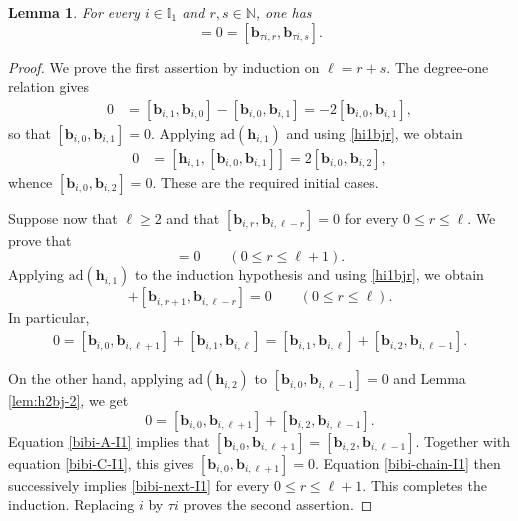 \documentclass[11pt,reqno]{amsart}
\numberwithin{equation}{section}
\newtheorem{lem}[thm]{Lemma}
\theoremstyle{definition}
\theoremstyle{remark}
\newcommand{\bN}{\mathbb{N}}
\newcommand{\bb}{\mathbf{b}}
\newcommand{\bh}{\mathbf{h}}
\newcommand{\gge}{\geqslant}
\newcommand{\lle}{\leqslant}
\newcommand{\I}{{\mathbb I}}
\begin{document}
\begin{lem}\label{lem:bibi-zero-I1}
For every $i\in\I_1$ and $r,s\in\bN$, one has
\begin{equation*}
[\bb_{i,r},\bb_{i,s}]=0=[\bb_{\tau i,r},\bb_{\tau i,s}].
\end{equation*}
\end{lem}
\begin{proof}
We prove the first assertion by induction on $\ell=r+s$. The degree-one
relation gives
\begin{align*}
0
&=[\bb_{i,1},\bb_{i,0}]-[\bb_{i,0},\bb_{i,1}]
=-2[\bb_{i,0},\bb_{i,1}],
\end{align*}
so that $[\bb_{i,0},\bb_{i,1}]=0$. Applying
$\mathrm{ad}(\bh_{i,1})$ and using \eqref{hi1bjr}, we obtain
\begin{align*}
0
&=[\bh_{i,1},[\bb_{i,0},\bb_{i,1}]]
=2[\bb_{i,0},\bb_{i,2}],
\end{align*}
whence $[\bb_{i,0},\bb_{i,2}]=0$. These are the required initial cases.

Suppose now that $\ell\gge 2$ and that
$[\bb_{i,r},\bb_{i,\ell-r}]=0$ for every $0\lle r\lle\ell$. We prove
that
\begin{equation}
[\bb_{i,r},\bb_{i,\ell+1-r}]=0
\qquad (0\lle r\lle \ell+1).
\label{bibi-next-I1}
\end{equation}
Applying $\mathrm{ad}(\bh_{i,1})$ to the induction hypothesis and using
\eqref{hi1bjr}, we obtain
\begin{equation}
[\bb_{i,r},\bb_{i,\ell+1-r}]
+[\bb_{i,r+1},\bb_{i,\ell-r}]=0
\qquad (0\lle r\lle\ell).
\label{bibi-chain-I1}
\end{equation}
In particular,
\begin{align}
0=[\bb_{i,0},\bb_{i,\ell+1}]
  +[\bb_{i,1},\bb_{i,\ell}]=[\bb_{i,1},\bb_{i,\ell}]
  +[\bb_{i,2},\bb_{i,\ell-1}].
\label{bibi-A-I1}
\end{align}

On the other hand, applying $\mathrm{ad}(\bh_{i,2})$ to
$[\bb_{i,0},\bb_{i,\ell-1}]=0$ and Lemma \ref{lem:h2bj-2}, we get
\begin{equation}
0=[\bb_{i,0},\bb_{i,\ell+1}]
  +[\bb_{i,2},\bb_{i,\ell-1}].
\label{bibi-C-I1}
\end{equation}
Equation \eqref{bibi-A-I1}  implies that $[\bb_{i,0},\bb_{i,\ell+1}]
=[\bb_{i,2},\bb_{i,\ell-1}]$.
Together with equation \eqref{bibi-C-I1}, this gives
$[\bb_{i,0},\bb_{i,\ell+1}]=0$. Equation
\eqref{bibi-chain-I1} then successively implies
\eqref{bibi-next-I1} for every $0\lle r\lle\ell+1$. This completes the
induction. Replacing $i$ by $\tau i$ proves the second assertion.
\end{proof}
\end{document}

